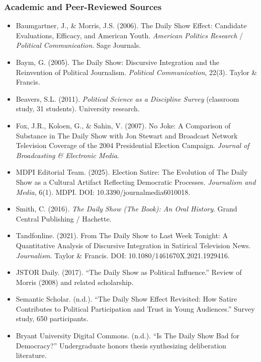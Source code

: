 \documentclass[11pt,letterpaper]{article}
\begin{document}
\subsubsection{Academic and Peer-Reviewed Sources}

\begin{itemize}[leftmargin=*]
  \item Baumgartner, J., \& Morris, J.S. (2006). The Daily Show Effect: Candidate Evaluations, Efficacy, and American Youth. \textit{American Politics Research} / \textit{Political Communication}. Sage Journals.
  \item Baym, G. (2005). The Daily Show: Discursive Integration and the Reinvention of Political Journalism. \textit{Political Communication}, 22(3). Taylor \& Francis.
  \item Beavers, S.L. (2011). \textit{Political Science as a Discipline Survey} (classroom study, 31 students). University research.
  \item Fox, J.R., Koloen, G., \& Sahin, V. (2007). No Joke: A Comparison of Substance in The Daily Show with Jon Stewart and Broadcast Network Television Coverage of the 2004 Presidential Election Campaign. \textit{Journal of Broadcasting \& Electronic Media}.
  \item MDPI Editorial Team. (2025). Election Satire: The Evolution of The Daily Show as a Cultural Artifact Reflecting Democratic Processes. \textit{Journalism and Media}, 6(1). MDPI. DOI: 10.3390/journalmedia6010018.
  \item Smith, C. (2016). \textit{The Daily Show (The Book): An Oral History}. Grand Central Publishing / Hachette.
  \item Tandfonline. (2021). From The Daily Show to Last Week Tonight: A Quantitative Analysis of Discursive Integration in Satirical Television News. \textit{Journalism}. Taylor \& Francis. DOI: 10.1080/1461670X.2021.1929416.
  \item JSTOR Daily. (2017). ``The Daily Show as Political Influence.'' Review of Morris (2008) and related scholarship.
  \item Semantic Scholar. (n.d.). ``The Daily Show Effect Revisited: How Satire Contributes to Political Participation and Trust in Young Audiences.'' Survey study, 650 participants.
  \item Bryant University Digital Commons. (n.d.). ``Is The Daily Show Bad for Democracy?'' Undergraduate honors thesis synthesizing deliberation literature.
\end{itemize}
\end{document}

